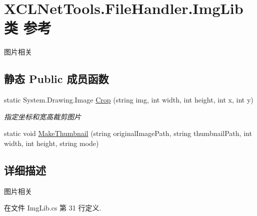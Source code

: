 \hypertarget{class_x_c_l_net_tools_1_1_file_handler_1_1_img_lib}{\section{X\-C\-L\-Net\-Tools.\-File\-Handler.\-Img\-Lib类 参考}
\label{class_x_c_l_net_tools_1_1_file_handler_1_1_img_lib}
}


图片相关  


\subsection*{静态 Public 成员函数}
\begin{DoxyCompactItemize}
\item 
static System.\-Drawing.\-Image \hyperlink{class_x_c_l_net_tools_1_1_file_handler_1_1_img_lib_ad00cc641f4f1585d61ce6c86962a6213}{Crop} (string img, int width, int height, int x, int y)
\begin{DoxyCompactList}\small\item\em 指定坐标和宽高裁剪图片 \end{DoxyCompactList}\item 
static void \hyperlink{class_x_c_l_net_tools_1_1_file_handler_1_1_img_lib_ac534eab24f71c848fb532ce77af53edc}{Make\-Thumbnail} (string original\-Image\-Path, string thumbnail\-Path, int width, int height, string mode)
\end{DoxyCompactItemize}


\subsection{详细描述}
图片相关 



在文件 Img\-Lib.\-cs 第 31 行定义.



